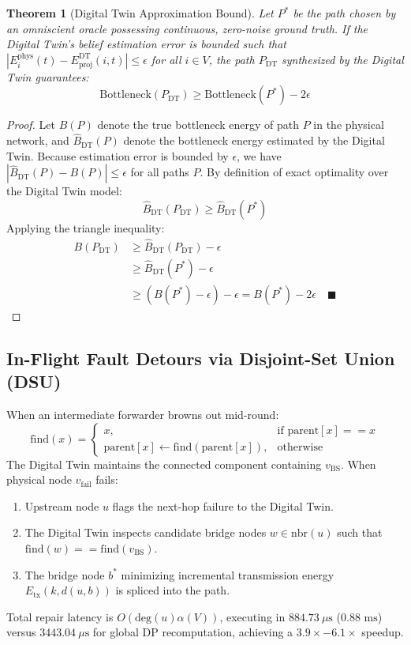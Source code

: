 \documentclass[journal]{IEEEtran}
\newtheorem{theorem}{Theorem}
\begin{document}
\begin{theorem}[Digital Twin Approximation Bound]
Let $P^*$ be the path chosen by an omniscient oracle possessing continuous, zero-noise ground truth. If the Digital Twin's belief estimation error is bounded such that $|E_i^{\text{phys}}(t) - E_{\text{proj}}^{\text{DT}}(i, t)| \le \epsilon$ for all $i \in V$, the path $P_{\text{DT}}$ synthesized by the Digital Twin guarantees:
\begin{equation}
\text{Bottleneck}(P_{\text{DT}}) \ge \text{Bottleneck}(P^*) - 2\epsilon
\end{equation}
\end{theorem}
\begin{proof}
Let $B(P)$ denote the true bottleneck energy of path $P$ in the physical network, and $\hat{B}_{\text{DT}}(P)$ denote the bottleneck energy estimated by the Digital Twin. Because estimation error is bounded by $\epsilon$, we have $|\hat{B}_{\text{DT}}(P) - B(P)| \le \epsilon$ for all paths $P$.
By definition of exact optimality over the Digital Twin model:
\begin{equation}
\hat{B}_{\text{DT}}(P_{\text{DT}}) \ge \hat{B}_{\text{DT}}(P^*)
\end{equation}
Applying the triangle inequality:
\begin{align}
B(P_{\text{DT}}) &\ge \hat{B}_{\text{DT}}(P_{\text{DT}}) - \epsilon \\
&\ge \hat{B}_{\text{DT}}(P^*) - \epsilon \\
&\ge (B(P^*) - \epsilon) - \epsilon = B(P^*) - 2\epsilon \quad \blacksquare
\end{align}
\end{proof}

\subsection{In-Flight Fault Detours via Disjoint-Set Union (DSU)}
When an intermediate forwarder browns out mid-round:
\begin{equation}
\text{find}(x) = \begin{cases} x, & \text{if } \text{parent}[x] == x \\ \text{parent}[x] \leftarrow \text{find}(\text{parent}[x]), & \text{otherwise} \end{cases}
\end{equation}
The Digital Twin maintains the connected component containing $v_{\text{BS}}$. When physical node $v_{\text{fail}}$ fails:
\begin{enumerate}
    \item Upstream node $u$ flags the next-hop failure to the Digital Twin.
    \item The Digital Twin inspects candidate bridge nodes $w \in \text{nbr}(u)$ such that $\text{find}(w) == \text{find}(v_{\text{BS}})$.
    \item The bridge node $b^*$ minimizing incremental transmission energy $E_{\text{tx}}(k, d(u, b))$ is spliced into the path.
\end{enumerate}
Total repair latency is $O(\text{deg}(u)\alpha(V))$, executing in $884.73\ \mu\text{s}$ ($0.88\text{ ms}$) versus $3443.04\ \mu\text{s}$ for global DP recomputation, achieving a $3.9\times - 6.1\times$ speedup.
\end{document}
